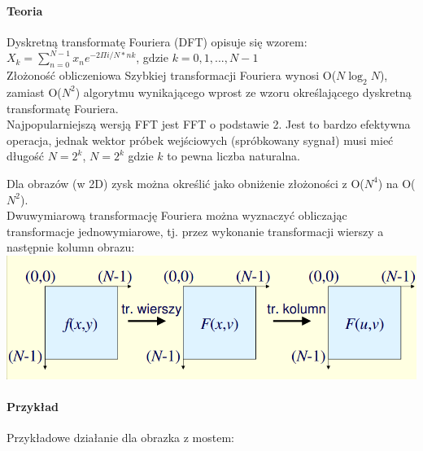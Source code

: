 \paragraph{Teoria} Dyskretną transformatę Fouriera (DFT) opisuje się wzorem:\\

\Large $X_{k} = \sum_{n=0}^{N-1} x_{n}e^{-2\Pi i/N * nk}$, gdzie $ k = 0,1, ..., N -1$\\
\newpage
Złożoność obliczeniowa Szybkiej transformacji Fouriera wynosi O($N\log _{2}N$), zamiast  O($N^{2}$)  algorytmu wynikającego wprost ze wzoru określającego dyskretną transformatę Fouriera. \\

Najpopularniejszą wersją FFT jest FFT o podstawie 2. Jest to bardzo efektywna operacja, jednak wektor próbek wejściowych (spróbkowany sygnał) musi mieć długość $ N=2^{k}$, $ N=2^{k}$ gdzie $ k$  to pewna liczba naturalna.  

Dla obrazów (w 2D) zysk można określić jako obniżenie złożoności z  O($N^{4}$) na  O($N^{2}$).\\

Dwuwymiarową transformację Fouriera można wyznaczyć obliczając transformacje jednowymiarowe, tj. przez wykonanie transformacji wierszy a następnie kolumn obrazu:\\

\includegraphics[scale=0.5]{figures/t2.png}
\newpage
\paragraph{Przykład} 
Przykładowe działanie dla obrazka z mostem:\\

